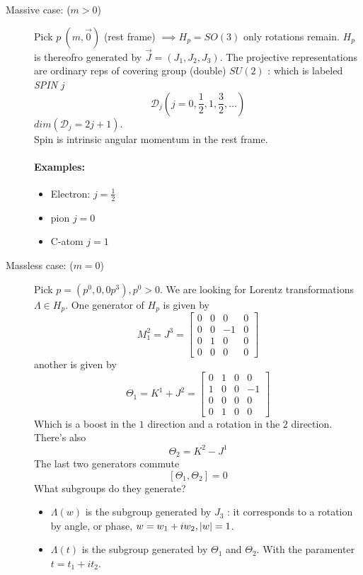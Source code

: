 \documentclass{report}
\begin{document}
\begin{description}
  \item[Massive case: ($m>0$)] Pick $p \ \left( m, \vec{0} \right) $ (rest frame) $\implies H_p = SO(3)$ only rotations remain. 
    $H_p$ is thereofro generated by $\vec{J} = \left( J_1,J_2,J_3 \right) $.
    The projective representations are ordinary reps of covering group (double) $SU(2)$ : which is labeled \emph{SPIN} $j$ \[
      \mathcal{D}_j \left( j = 0, \frac{1}{2}, 1 , \frac{3}{2}, \ldots \right) 
    \] $dim\left( \mathcal{D}_j = 2j + 1 \right) $.\\
    Spin is intrinsic angular momentum in the rest frame.
    \paragraph{Examples:}
    \begin{itemize}
      \item Electron: $j = \frac{1}{2}$ 
      \item pion $j = 0$ 
        \item C-atom  $j = 1$
    \end{itemize}
  \item[Massless case: ($m = 0$)] Pick $p = \left( p^0, 0,0 p^3 \right), p^0 > 0 $. We are looking for Lorentz transformations $\Lambda \in H_p$. One generator of $ H_p $ is given by \[
      M_1^2 = J^3 = \begin{bmatrix} 0 &0&0&0 \\ 0&0&-1&0 \\ 0&1&0&0 \\ 0&0&0&0 \end{bmatrix} 
  \] another is given by \[
      \Theta_1 = K^1 + J^2 = \begin{bmatrix} 0&1&0&0 \\ 1&0&0&-1  \\ 0&0&0&0 \\ 0&1&0&0 \end{bmatrix} 
  \] Which is a boost in the $1$ direction and a rotation in the $2$ direction. There's also \[
  \Theta_2 = K^2 - J^1
  \] The last two generators commute \[
  [\Theta_1, \Theta_2] = 0
  \] What subgroups do they generate?
  \begin{itemize}
    \item $\Lambda(w)$ is the subgroup generated by $J_3$ : it corresponds to a rotation by angle, or phase, $w = w_1 + i w_2, \abs{w} = 1$.
    \item $\Lambda(t)$ is the subgroup generated by $\Theta_1$ and $\Theta_2$. With the paramenter $t = t_1 + i t_2$.

\end{itemize}
\end{description}
\end{document}
